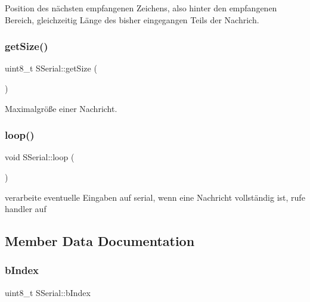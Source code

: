 Position des nächsten empfangenen Zeichens, also hinter den empfangenen Bereich, gleichzeitig Länge des bisher eingegangen Teils der Nachrich. 

\mbox{\label{class_s_serial_a1b6055bcc85e4ab6a9022ea696da81fe}} 
\subsubsection{\texorpdfstring{get\+Size()}{getSize()}}
{\footnotesize\ttfamily uint8\+\_\+t S\+Serial\+::get\+Size (\begin{DoxyParamCaption}{ }\end{DoxyParamCaption})\hspace{0.3cm}{\ttfamily [inline]}}



Maximalgröße einer Nachricht. 

\mbox{\label{class_s_serial_a4c07d6d5d036ca05717c73836c5cc807}} 
\subsubsection{\texorpdfstring{loop()}{loop()}}
{\footnotesize\ttfamily void S\+Serial\+::loop (\begin{DoxyParamCaption}{ }\end{DoxyParamCaption})}



verarbeite eventuelle Eingaben auf serial, wenn eine Nachricht vollständig ist, rufe handler auf 



\subsection{Member Data Documentation}
\mbox{\label{class_s_serial_a17036a378a918f18f0fc05b7d7adf7bd}} 
\subsubsection{\texorpdfstring{b\+Index}{bIndex}}
{\footnotesize\ttfamily uint8\+\_\+t S\+Serial\+::b\+Index\hspace{0.3cm}{\ttfamily [protected]}}



